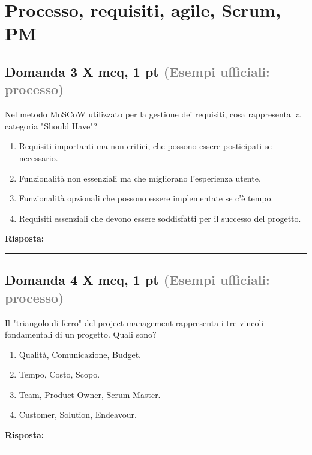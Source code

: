 \documentclass[a4paper,11pt]{article}
\begin{document}
\section{Processo, requisiti, agile, Scrum, PM}

\subsection*{Domanda 3 X \hfill {\small mcq, 1 pt \textcolor{gray}{(Esempi ufficiali: processo)}}}
Nel metodo MoSCoW utilizzato per la gestione dei requisiti, cosa rappresenta la categoria "Should Have"?

\begin{enumerate}[label=\alph*)]
\item Requisiti importanti ma non critici, che possono essere posticipati se necessario.
\item Funzionalità non essenziali ma che migliorano l'esperienza utente.
\item Funzionalità opzionali che possono essere implementate se c'è tempo.
\item Requisiti essenziali che devono essere soddisfatti per il successo del progetto.
\end{enumerate}
\vspace{0.2cm}
\noindent\textbf{Risposta:}\par
\vspace{1.5cm}\hrule


\subsection*{Domanda 4 X \hfill {\small mcq, 1 pt \textcolor{gray}{(Esempi ufficiali: processo)}}}
Il "triangolo di ferro" del project management rappresenta i tre vincoli fondamentali di un progetto. Quali sono?

\begin{enumerate}[label=\alph*)]
\item Qualità, Comunicazione, Budget.
\item Tempo, Costo, Scopo.
\item Team, Product Owner, Scrum Master.
\item Customer, Solution, Endeavour.
\end{enumerate}
\vspace{0.2cm}
\noindent\textbf{Risposta:}\par
\vspace{1.5cm}\hrule
\end{document}
